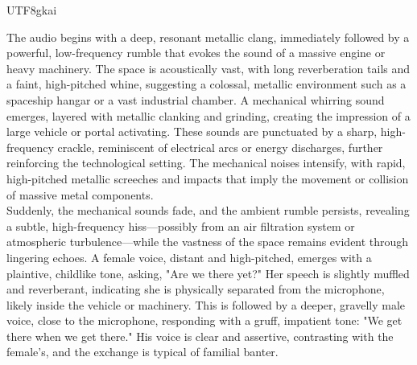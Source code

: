 \begin{CJK*}{UTF8}{gkai}

\begin{tcolorbox}[
    colback=lightgray,
    colframe=black,
    boxrule=2pt,
    sharp corners,
    width=\textwidth,
    title={Analysis of Mixed Speech, Audio, and Music},
    colbacktitle=black,
    coltitle=white,
    fonttitle=\bfseries\sffamily,
    halign title=center,
]
\ttfamily
The audio begins with a deep, resonant metallic clang, immediately followed by a powerful, low-frequency rumble that evokes the sound of a massive engine or heavy machinery. The space is acoustically vast, with long reverberation tails and a faint, high-pitched whine, suggesting a colossal, metallic environment such as a spaceship hangar or a vast industrial chamber. A mechanical whirring sound emerges, layered with metallic clanking and grinding, creating the impression of a large vehicle or portal activating. These sounds are punctuated by a sharp, high-frequency crackle, reminiscent of electrical arcs or energy discharges, further reinforcing the technological setting. The mechanical noises intensify, with rapid, high-pitched metallic screeches and impacts that imply the movement or collision of massive metal components.\\

Suddenly, the mechanical sounds fade, and the ambient rumble persists, revealing a subtle, high-frequency hiss—possibly from an air filtration system or atmospheric turbulence—while the vastness of the space remains evident through lingering echoes. A female voice, distant and high-pitched, emerges with a plaintive, childlike tone, asking, "Are we there yet?" Her speech is slightly muffled and reverberant, indicating she is physically separated from the microphone, likely inside the vehicle or machinery. This is followed by a deeper, gravelly male voice, close to the microphone, responding with a gruff, impatient tone: "We get there when we get there." His voice is clear and assertive, contrasting with the female’s, and the exchange is typical of familial banter.\\


\end{tcolorbox}
\end{CJK*}
